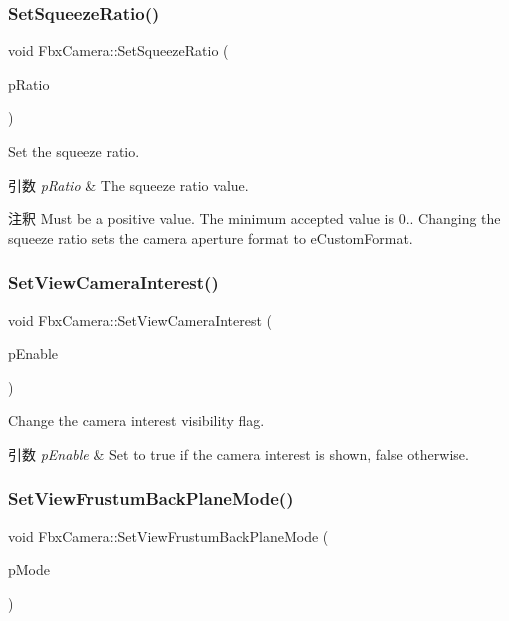 \subsubsection{\texorpdfstring{Set\+Squeeze\+Ratio()}{SetSqueezeRatio()}}
{\footnotesize\ttfamily void Fbx\+Camera\+::\+Set\+Squeeze\+Ratio (\begin{DoxyParamCaption}\item[{double}]{p\+Ratio }\end{DoxyParamCaption})}

Set the squeeze ratio. 
\begin{DoxyParams}{引数}
{\em p\+Ratio} & The squeeze ratio value. \\
\hline
\end{DoxyParams}
\begin{DoxyRemark}{注釈}
Must be a positive value. The minimum accepted value is 0.. Changing the squeeze ratio sets the camera aperture format to e\+Custom\+Format. 
\end{DoxyRemark}
\mbox{\label{class_fbx_camera_a1d7051d940ae08dd4ef8e8283dee3e9a}} 
\subsubsection{\texorpdfstring{Set\+View\+Camera\+Interest()}{SetViewCameraInterest()}}
{\footnotesize\ttfamily void Fbx\+Camera\+::\+Set\+View\+Camera\+Interest (\begin{DoxyParamCaption}\item[{bool}]{p\+Enable }\end{DoxyParamCaption})}

Change the camera interest visibility flag. 
\begin{DoxyParams}{引数}
{\em p\+Enable} & Set to {\ttfamily true} if the camera interest is shown, {\ttfamily false} otherwise. \\
\hline
\end{DoxyParams}
\mbox{\label{class_fbx_camera_ab7a31318dfa38c8dc9baec9dd04b4dab}} 
\subsubsection{\texorpdfstring{Set\+View\+Frustum\+Back\+Plane\+Mode()}{SetViewFrustumBackPlaneMode()}}
{\footnotesize\ttfamily void Fbx\+Camera\+::\+Set\+View\+Frustum\+Back\+Plane\+Mode (\begin{DoxyParamCaption}\item[{\hyperlink{class_fbx_camera_ab7b9d3e546552049a79261a444f9b44a}{E\+Front\+Back\+Plane\+Display\+Mode}}]{p\+Mode }\end{DoxyParamCaption})}

